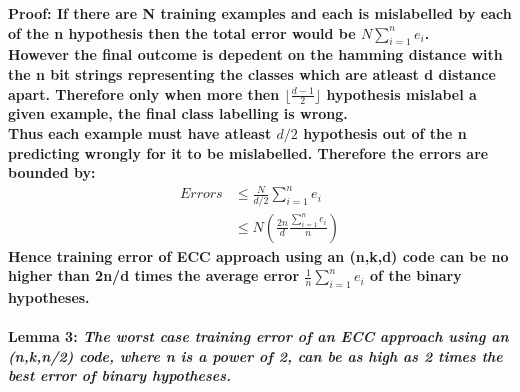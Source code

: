 \documentclass[11pt]{article}
\begin{document}
    \bf Proof: \normalfont If there are N training examples and each is mislabelled by each of the n hypothesis then the total error would be $N \sum_{i=1}^n e_i$.\\
    However the final outcome is depedent on the hamming distance with the n bit strings representing the classes which are atleast d distance apart. Therefore only when more then $\lfloor\frac{d-1}{2}\rfloor$ hypothesis mislabel a given example, the final class labelling is wrong.\\
    Thus each example must have atleast $d/2$ hypothesis out of the n predicting wrongly for it to be mislabelled. Therefore the errors are bounded by:
    \begin{align*}
        Errors &\leq \frac{N}{d/2} \sum_{i=1}^n e_i\\
            &\leq N \left(\frac{2n}{d} \frac{\sum_{i=1}^n e_i}{n}\right)
    \end{align*}
    Hence training error of ECC approach using an (n,k,d) code can be no higher than 2n/d times the average error $\frac{1}{n}\sum_{i=1}^n e_i$ of the binary hypotheses.\\\\
    \bf Lemma 3: \normalfont \textit{ The worst case training error of an ECC approach using an (n,k,n/2) code, where n is a power of 2, can be as high as 2 times the best error of binary hypotheses.}
\end{document}
